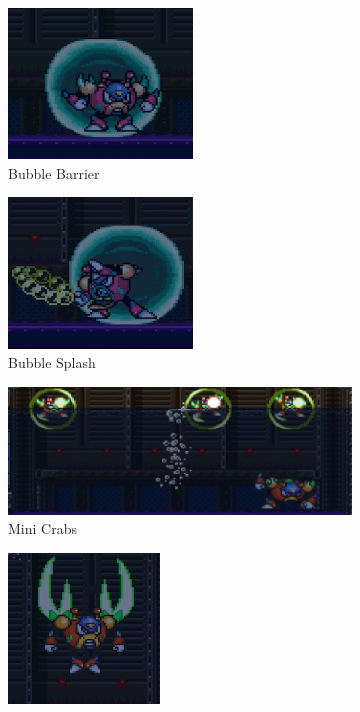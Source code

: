 \begin{figure}[htp]
	\centering
	\begin{subfigure}{0.40\linewidth}
		\centering
		\includegraphics[height=4cm]{figures/X2/Bubble_crab/Crab_bubble.png}
		\caption{Bubble Barrier}
	\end{subfigure}
	\begin{subfigure}{0.40\linewidth}
		\centering
		\includegraphics[height=4cm]{figures/X2/Bubble_crab/Crab_splasher.png}
		\caption{Bubble Splash}
	\end{subfigure}
	\begin{subfigure}{\linewidth}
		\centering
		\includegraphics[width=\linewidth]{figures/X2/Bubble_crab/Crab_minicrab.png}
		\caption{Mini Crabs}
	\end{subfigure}
	\begin{subfigure}{0.40\linewidth}
	\centering
	\includegraphics[height=4cm]{figures/X2/Bubble_crab/Crab_pinch.png}

\end{subfigure}
\end{figure}
